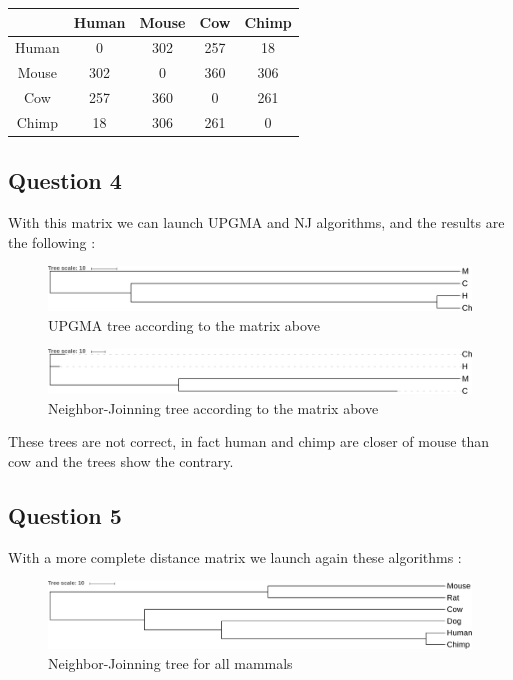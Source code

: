 \documentclass[]{article}
\begin{document}
\begin{tabular}{|*{5}{c|}}
	\hline
	   & Human  & Mouse  & Cow  & Chimp \\
	\hline
	Human  & 0  & 302  & 257  & 18 \\
	\hline
	Mouse  & 302  & 0  & 360 & 306 \\
	\hline
	Cow  & 257  & 360 & 0 & 261 \\
	\hline
	Chimp  & 18 & 306 & 261 & 0 \\
	\hline
	
\end{tabular}


\subsection{Question 4}

With this matrix we can launch UPGMA and NJ algorithms, and the results are the following :
 
\begin{figure}[H]
	\includegraphics*[width = \linewidth]{../UPGMA1.pdf}
	\caption{\label{upgma1} UPGMA tree according to the matrix above }
\end{figure}

\begin{figure}[H]
	\includegraphics*[width = \linewidth]{../NJ1.pdf}
	\caption{\label{nj1} Neighbor-Joinning tree according to the matrix above }
\end{figure}

These trees are not correct, in fact human and chimp are closer of mouse than cow and the trees show the contrary. 

\subsection{Question 5}

With a more complete distance matrix we launch again these algorithms :

\begin{figure}[h!]
	\includegraphics*[width = \linewidth]{../files/UPGMA.pdf}
	\caption{\label{upgma2} Neighbor-Joinning tree for all mammals }
\end{figure}
\end{document}
